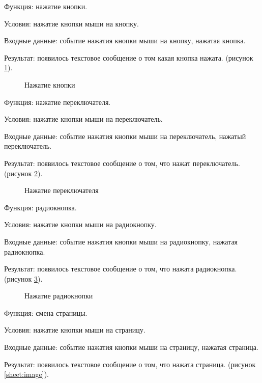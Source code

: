 Функция: нажатие кнопки.

Условия: нажатие кнопки мыши на кнопку.

Входные данные: событие нажатия кнопки мыши на кнопку, нажатая кнопка.

Результат: появилось текстовое сообщение о том какая кнопка нажата. (рисунок \ref{button:image}).

\begin{figure}[H] %
	\caption{Нажатие кнопки}
	\label{button:image}
\end{figure}

Функция: нажатие переключателя.

Условия: нажатие кнопки мыши на переключатель.

Входные данные: событие нажатия кнопки мыши на переключатель, нажатый переключатель.

Результат: появилось текстовое сообщение о том, что нажат переключатель. (рисунок \ref{switcher:image}).

\begin{figure}[H] %
	\caption{Нажатие переключателя}
	\label{switcher:image}
\end{figure}

Функция: радиокнопка.

Условия: нажатие кнопки мыши на радиокнопку.

Входные данные: событие нажатия кнопки мыши на радиокнопку, нажатая радиокнопка.

Результат: появилось текстовое сообщение о том, что нажата радиокнопка. (рисунок \ref{radio:image}).

\begin{figure}[H] %
	\caption{Нажатие радиокнопки}
	\label{radio:image}
\end{figure}

Функция: смена страницы.

Условия: нажатие кнопки мыши на страницу.

Входные данные: событие нажатия кнопки мыши на страницу, нажатая страница.

Результат: появилось текстовое сообщение о том, что нажата страница. (рисунок \ref{sheet:image}).

